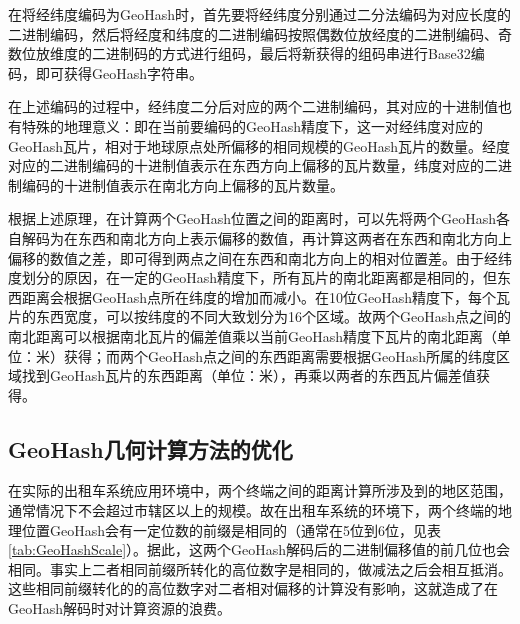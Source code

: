 在将经纬度编码为GeoHash时，首先要将经纬度分别通过二分法编码为对应长度的二进制编码，然后将经度和纬度的二进制编码按照偶数位放经度的二进制编码、奇数位放维度的二进制码的方式进行组码，最后将新获得的组码串进行Base32编码，即可获得GeoHash字符串。

在上述编码的过程中，经纬度二分后对应的两个二进制编码，其对应的十进制值也有特殊的地理意义：即在当前要编码的GeoHash精度下，这一对经纬度对应的GeoHash瓦片，相对于地球原点处所偏移的相同规模的GeoHash瓦片的数量。经度对应的二进制编码的十进制值表示在东西方向上偏移的瓦片数量，纬度对应的二进制编码的十进制值表示在南北方向上偏移的瓦片数量。

根据上述原理，在计算两个GeoHash位置之间的距离时，可以先将两个GeoHash各自解码为在东西和南北方向上表示偏移的数值，再计算这两者在东西和南北方向上偏移的数值之差，即可得到两点之间在东西和南北方向上的相对位置差。由于经纬度划分的原因，在一定的GeoHash精度下，所有瓦片的南北距离都是相同的，但东西距离会根据GeoHash点所在纬度的增加而减小。在10位GeoHash精度下，每个瓦片的东西宽度，可以按纬度的不同大致划分为16个区域。故两个GeoHash点之间的南北距离可以根据南北瓦片的偏差值乘以当前GeoHash精度下瓦片的南北距离（单位：米）获得；而两个GeoHash点之间的东西距离需要根据GeoHash所属的纬度区域找到GeoHash瓦片的东西距离（单位：米），再乘以两者的东西瓦片偏差值获得。

\subsection{GeoHash几何计算方法的优化}
在实际的出租车系统应用环境中，两个终端之间的距离计算所涉及到的地区范围，通常情况下不会超过市辖区以上的规模。故在出租车系统的环境下，两个终端的地理位置GeoHash会有一定位数的前缀是相同的（通常在5位到6位，见表\ref{tab:GeoHashScale}）。据此，这两个GeoHash解码后的二进制偏移值的前几位也会相同。事实上二者相同前缀所转化的高位数字是相同的，做减法之后会相互抵消。这些相同前缀转化的的高位数字对二者相对偏移的计算没有影响，这就造成了在GeoHash解码时对计算资源的浪费。

